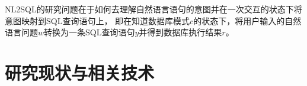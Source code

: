 NL2SQL的研究问题在于如何去理解自然语言语句的意图并在一次交互的状态下将意图映射到SQL查询语句上，
即在知道数据库模式$c$的状态下，将用户输入的自然语言问题$w$转换为一条SQL查询语句$y$并得到数据库执行结果$r$。



  


  

\section{研究现状与相关技术}
